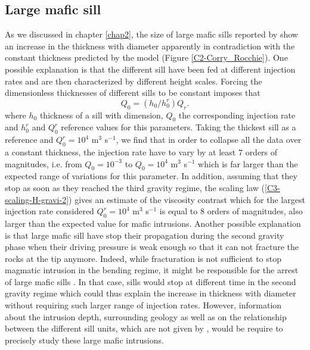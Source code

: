 \subsection{Large mafic sill}
\label{sec:large-mafic-sill}


As we discussed in chapter \ref{chap2},  the size of large mafic sills
reported by \citet{Cruden:tg}  show an increase in  the thickness with
diameter  apparently  in  contradiction with  the  constant  thickness
predicted by the model  (Figure \ref{C2-Corry_Rocchie}).  One possible
explanation  is that  the different  sill have  been fed  at different
injection  rates  and  are  then  characterized  by  different  height
scales. Forcing the dimensionless thicknesses of different sills to be
constant imposes that
\begin{equation}
  Q_0 = (h_0/h_0^r)Q_r.
\end{equation}
where  $h_0$   thickness  of   a  sill   with  dimension,   $Q_0$  the
corresponding injection rate and  $h_0^r$ and $Q_0^r$ reference values
for  this parameters.   Taking the  thickest sill  as a  reference and
$Q_0^r = 10^4$  m$^3$ s$^{-1}$, we find that in  order to collapse all
the data over a constant thickness, the injection rate have to vary by
at  least  $7$  orders  of magnitudes,  i.e.   from  $Q_0=10^{-3}$  to
$Q_0= 10^{4}$  m$^3$ s$^{-1}$  which is far  larger than  the expected
range of  variations for this  parameter.  In addition,  assuming that
they  stop as  soon  as they  reached the  third  gravity regime,  the
scaling  law (\ref{C3-scaling-H-gravi-2})  gives  an  estimate of  the
viscosity  contrast which  for the  largest injection  rate considered
$Q_0^r=10^4$ m$^3$ s$^{-1}$ is equal to $8$ orders of magnitudes, also
larger than the expected value for mafic intrusions.  Another possible
explanation  is that  large  mafic sill  have  stop their  propagation
during the  second gravity phase  when their driving pressure  is weak
enough  so that  it can  not fracture  the rocks  at the  tip anymore.
Indeed,  while  fracturation  is   not  sufficient  to  stop  magmatic
intrusion  in the  bending regime,  it  might be  responsible for  the
arrest  of large  mafic sills  \citep{Michaut:2011kg}.  In  that case,
sills would stop at different time  in the second gravity regime which
could thus  explain the  increase in  thickness with  diameter without
requiring such larger range  of injection rates.  However, information
about  the intrusion  depth, surrounding  geology  as well  as on  the
relationship between the different sill  units, which are not given by
\citet{Cruden:tg},  would be  require to  precisely study  these large
mafic intrusions.


